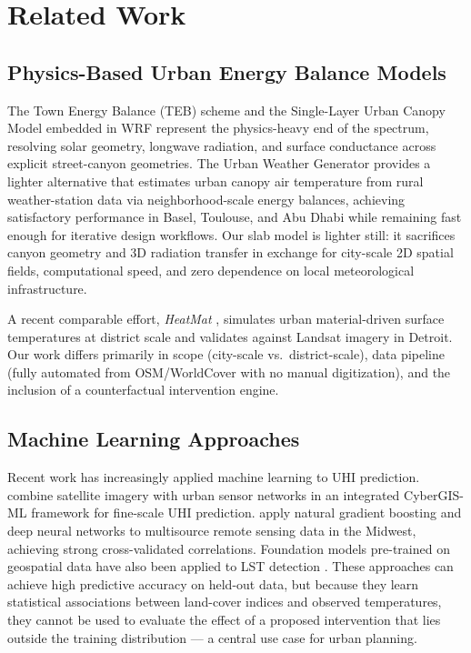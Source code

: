 \documentclass[12pt, letterpaper]{article}
\begin{document}
\section{Related Work}
\label{sec:related}

\subsection{Physics-Based Urban Energy Balance Models}

The Town Energy Balance (TEB) scheme \citep{masson2000physically} and
the Single-Layer Urban Canopy Model \citep{kusaka2001simple} embedded in
WRF represent the physics-heavy end of the spectrum, resolving solar geometry,
longwave radiation, and surface conductance across explicit street-canyon
geometries. The Urban Weather Generator \citep{bueno2013urban} provides a
lighter alternative that estimates urban canopy air temperature from rural
weather-station data via neighborhood-scale energy balances, achieving
satisfactory performance in Basel, Toulouse, and Abu Dhabi while remaining
fast enough for iterative design workflows. Our slab model is lighter still:
it sacrifices canyon geometry and 3D radiation transfer in exchange for
city-scale 2D spatial fields, computational speed, and zero dependence on
local meteorological infrastructure.

A recent comparable effort, \textit{HeatMat} \citep{heatmat2025}, simulates
urban material-driven surface temperatures at district scale and validates
against Landsat imagery in Detroit. Our work differs primarily in scope
(city-scale vs.\ district-scale), data pipeline (fully automated from
OSM/WorldCover with no manual digitization), and the inclusion of a
counterfactual intervention engine.

\subsection{Machine Learning Approaches}

Recent work has increasingly applied machine learning to UHI prediction.
\citet{lyu2022integrated} combine satellite imagery with urban sensor networks
in an integrated CyberGIS-ML framework for fine-scale UHI prediction.
\citet{hoang2025geospatial} apply natural gradient boosting and deep neural
networks to multisource remote sensing data in the Midwest, achieving strong
cross-validated correlations. Foundation models pre-trained on geospatial data
have also been applied to LST detection \citep{bhamjee2024detection}.
These approaches can achieve high predictive accuracy on held-out data,
but because they learn statistical associations between land-cover indices
and observed temperatures, they cannot be used to evaluate the effect of a
proposed intervention that lies outside the training distribution —
a central use case for urban planning.
\end{document}
